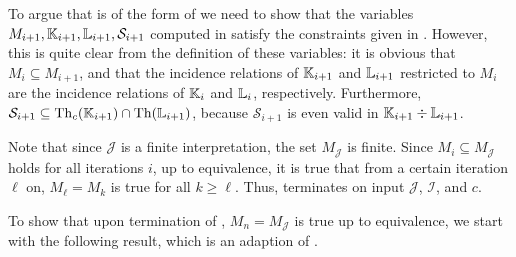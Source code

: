 To argue that  is of the form of
 we need to show that the
variables $M_{i+1}, {\mathbb{K}}_{i+1}, {\mathbb{L}}_{i+1}, \mathcal{S}_{i+1}$ computed in
 satisfy the constraints given in
.  However, this is quite
clear from the definition of these variables: it is obvious that $M_{i} \subseteq
M_{i+1}$, and that the incidence relations of ${\mathbb{K}}_{i+1}$ and ${\mathbb{L}}_{i+1}$ restricted
to $M_{i}$ are the incidence relations of ${\mathbb{K}}_{i}$ and ${\mathbb{L}}_{i}$, respectively.
Furthermore, $\mathcal{S}_{i+1} \subseteq \operatorname{Th}_{c}({\mathbb{K}}_{i+1}) \cap \operatorname{Th}({\mathbb{L}}_{i+1})$,
because $\mathcal{S}_{i+1}$ is even valid in ${\mathbb{K}}_{i+1} \div {\ensuremath{\mathbb{L}}}_{i+1}$.

Note that since $\mathcal{J}$ is a finite interpretation, the set $M_{\mathcal{J}}$ is
finite.  Since $M_{i} \subseteq M_{\mathcal{J}}$ holds for all iterations $i$, up to
equivalence, it is true that from a certain iteration $\ell$ on, $M_{\ell} = M_{k}$ is
true for all $k \geq \ell$.  Thus, 
terminates on input $\mathcal{J}$, $\mathcal{I}$, and $c$.

To show that upon termination of , $M_{n} =
M_{\mathcal{J}}$ is true up to equivalence, we start with the following result, which is
an adaption of \cite[Lemma~6.7]{Diss-Felix}.

